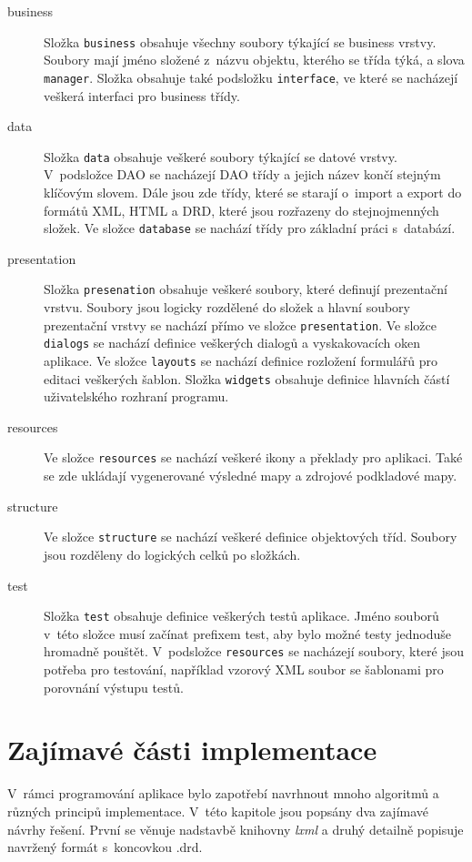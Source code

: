\documentclass[thesis=B,czech]{resources/FITthesis}[2012/06/26]
\begin{document}
\begin{description}
\item[business] Složka \texttt{business} obsahuje všechny soubory týkající se business vrstvy. Soubory mají jméno složené z~názvu objektu, kterého se třída týká, a slova \texttt{manager}. Složka obsahuje také podsložku \texttt{interface}, ve které se nacházejí veškerá interfaci pro business třídy.

\item[data] Složka \texttt{data} obsahuje veškeré soubory týkající se datové vrstvy. V~podsložce DAO se nacházejí DAO třídy a jejich název končí stejným klíčovým slovem. Dále jsou zde třídy, které se starají o~import a export do formátů XML, HTML a DRD, které jsou rozřazeny do stejnojmenných složek. Ve složce \texttt{database} se nachází třídy pro základní práci s~databází.

\item[presentation]Složka \texttt{presenation} obsahuje veškeré soubory, které definují prezentační vrstvu. Soubory jsou logicky rozdělené do složek a hlavní soubory prezentační vrstvy se nachází přímo ve složce \texttt{presentation}. Ve složce \texttt{dialogs} se nachází definice veškerých dialogů a vyskakovacích oken aplikace. Ve složce \texttt{layouts} se nachází definice rozložení formulářů pro editaci veškerých šablon. Složka \texttt{widgets} obsahuje definice hlavních částí uživatelského rozhraní programu.

\item[resources] Ve složce \texttt{resources} se nachází veškeré ikony a překlady pro aplikaci. Také se zde ukládají vygenerované výsledné mapy a zdrojové podkladové mapy.

\item[structure] Ve složce \texttt{structure} se nachází veškeré definice objektových tříd. Soubory jsou rozděleny do logických celků po složkách.

\item[test] Složka \texttt{test} obsahuje definice veškerých testů aplikace. Jméno souborů v~této složce musí začínat prefixem test, aby bylo možné testy jednoduše hromadně pouštět. V~podsložce \texttt{resources} se nacházejí soubory, které jsou potřeba pro testování, například vzorový XML soubor se šablonami pro porovnání výstupu testů.
\end{description}

\section{Zajímavé části implementace}
V~rámci programování aplikace bylo zapotřebí navrhnout mnoho algoritmů a různých principů implementace. V~této kapitole jsou popsány dva zajímavé návrhy řešení. První se věnuje nadstavbě knihovny \textit{lxml} a druhý detailně popisuje navržený formát s~koncovkou .drd.
\end{document}
